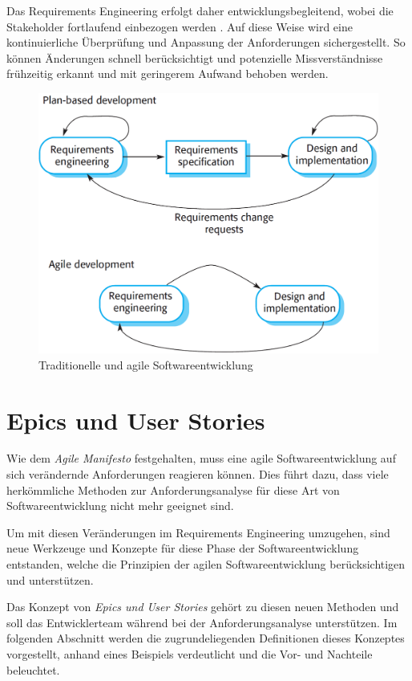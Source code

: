 \documentclass[acmtog]{acmart}
\begin{document}
Das Requirements Engineering erfolgt daher entwicklungsbegleitend, wobei die Stakeholder fortlaufend einbezogen werden \cite{sommerville16}. Auf diese Weise wird eine kontinuierliche Überprüfung und Anpassung der Anforderungen sichergestellt.
So können Änderungen schnell berücksichtigt und potenzielle Missverständnisse frühzeitig erkannt und mit geringerem Aufwand behoben werden.

\begin{figure}[t]
  \centering
  \includegraphics[width=\linewidth]{images/plandriven-and-agil-development.png}
  \caption{Traditionelle und agile Softwareentwicklung \cite{sommerville16}}
    \label{fig:development}
  \Description{}
\end{figure}

\section{Epics und User Stories}
Wie dem \emph{Agile Manifesto} \cite{beedle_principles_2001} festgehalten, muss eine agile Softwareentwicklung
auf sich verändernde Anforderungen reagieren können.
Dies führt dazu, dass viele herkömmliche Methoden zur Anforderungsanalyse für diese Art von Softwareentwicklung
nicht mehr geeignet sind.

Um mit diesen Veränderungen im Requirements Engineering umzugehen, sind neue Werkzeuge und Konzepte
für diese Phase der Softwareentwicklung entstanden, welche die Prinzipien der agilen Softwareentwicklung
berücksichtigen und unterstützen.

Das Konzept von \emph{Epics und User Stories} gehört zu diesen neuen Methoden und soll das Entwicklerteam
während bei der Anforderungsanalyse unterstützen. Im folgenden Abschnitt werden die zugrundeliegenden Definitionen
dieses Konzeptes vorgestellt, anhand eines Beispiels verdeutlicht und die Vor- und Nachteile beleuchtet.
\end{document}
